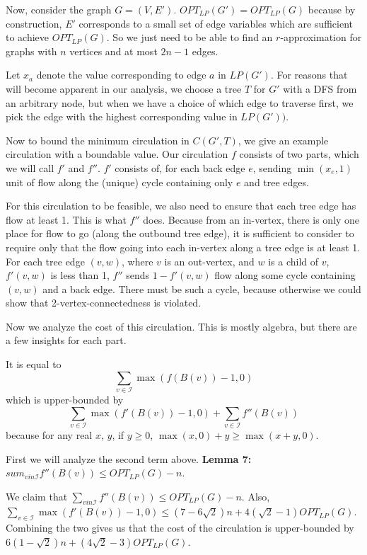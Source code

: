 \documentclass[12pt]{article}
\begin{document}
Now, consider the graph $G = (V, E')$.  $OPT_{LP}(G') = OPT_{LP}(G)$ because by
construction, $E'$ corresponds to a small set of edge variables which are sufficient
to achieve $OPT_{LP}(G)$.  So we just need to be able to find an
$r$-approximation for graphs with $n$ vertices and at most $2n-1$ edges.

Let $x_a$ denote the value corresponding to edge $a$ in $LP(G')$.  For reasons that will
become apparent in our analysis, we choose a tree $T$ for $G'$ with a DFS from an
arbitrary node, but when we have a choice of which edge to traverse first, we
pick the edge with the highest corresponding value in $LP(G'))$.

Now to bound the minimum circulation in $C(G', T)$, we give an example
circulation with a boundable value.  Our circulation $f$ consists of two parts,
which we will call $f'$ and $f''$.  $f'$ consists of, for each back edge $e$,
sending $\min(x_e, 1)$ unit of flow along the (unique) cycle containing only $e$
and tree edges.

For this circulation to be feasible, we also need to ensure that each tree edge
has flow at least 1.  This is what $f''$ does.  Because from an in-vertex, there
is only one place for flow to go (along the outbound tree edge), it is
sufficient to consider to require only that the flow going into each in-vertex
along a tree edge is at least 1. For each tree edge $(v, w)$, where $v$ is an
out-vertex, and $w$ is a child of $v$, $f'(v,w)$ is less than 1, $f''$ sends $1
- f'(v,w)$ flow along some cycle containing $(v,w)$ and a back edge.  There must be
such a cycle, because otherwise we could show that 2-vertex-connectedness is
violated.

Now we analyze the cost of this circulation.  This is mostly algebra, but there
are a few insights for each part.

It is equal to 
\[
\sum_{v \in \mathcal{I}} \max(f(B(v))-1, 0)
\]
which is upper-bounded by
\[
\sum_{v \in \mathcal{I}} \max(f'(B(v))-1,0) + \sum_{v \in \mathcal{I}} f''(B(v))
\]
because for any real $x$, $y$, if $y \ge 0$, $\max \left ( x, 0 \right ) + y \ge \max
\left ( x + y, 0 \right )$.

First we will analyze the second term above.
{\bf Lemma 7:}
$sum_{v in \mathcal{I}} f''(B(v)) \le OPT_{LP}(G) - n$.

We claim that $\sum_{v in \mathcal{I}} f''(B(v)) \le OPT_{LP}(G) - n$.
Also, $\sum_{v \in \mathcal{I}} \max(f'(B(v)) - 1, 0) \le (7 - 6 \sqrt{2})n +
4(\sqrt{2} - 1)OPT_{LP}(G)$.  
Combining the two gives us that the cost of the circulation is upper-bounded by
$6(1- \sqrt{2})n + (4\sqrt{2} - 3)OPT_{LP}(G)$.
\end{document}
